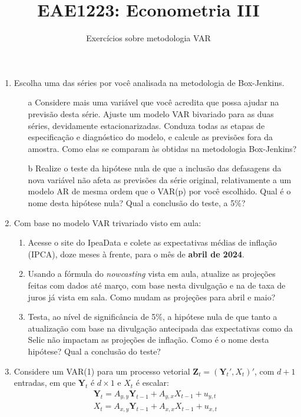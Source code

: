 \documentclass[10pt,a4paper]{article}
\title{\large EAE1223: Econometria III}
\author{\normalsize Exercícios sobre metodologia VAR}
\date{}
\begin{document}
	\maketitle
	\begin{enumerate}
\item Escolha uma das séries por você analisada na metodologia de Box-Jenkins.
\begin{enumerate}
	\item[a] Considere mais uma variável que você acredita que possa ajudar na previsão desta série. Ajuste um modelo VAR bivariado para as duas séries, devidamente estacionarizadas. Conduza todas as etapas de especificação e diagnóstico do modelo, e calcule as previsões fora da amostra. Como elas se comparam às obtidas na metodologia Box-Jenkins?
	\item[b] Realize o teste da hipótese nula de que a inclusão das defasagens da nova variável não afeta as previsões da série original, relativamente a um modelo AR de mesma ordem que o VAR(p) por você escolhido. Qual é o nome desta hipótese nula? Qual a conclusão do teste, a 5\%?
\end{enumerate}
\item Com base no modelo VAR trivariado visto em aula:
\begin{enumerate}
	\item Acesse o site do IpeaData e colete as expectativas médias de inflação (IPCA), doze meses à frente, para o mês de \textbf{abril de 2024}.
	\item Usando a fórmula do \textit{nowcasting} vista em aula, atualize as projeções feitas com dados até março, com base nesta divulgação e na de taxa de juros já vista em sala. Como mudam as projeções para abril e maio?
	\item Testa, ao nível de significância de 5\%, a hipótese nula de que tanto a atualização com base na divulgação antecipada das expectativas como da Selic não impactam as projeções de inflação. Como é o nome desta hipótese? Qual a conclusão do teste?
\end{enumerate}

\item Considere um VAR(1) para um processo vetorial $\boldsymbol{Z}_t = (\boldsymbol{Y}_t', X_t)'$, com $d+1$ entradas, em que $\boldsymbol{Y}_t$ é $d\times 1$ e $X_t$ é escalar:
\begin{align}
\boldsymbol{Y}_t = A_{y,y}\boldsymbol{Y}_{t-1} + A_{y,x}X_{t-1} + u_{y,t}  \label{full}
\\
X_t = A_{x,y}\boldsymbol{Y}_{t-1} + A_{x,x}X_{t-1} + u_{x,t}  \label{eq_marginal}
\end{align}


\end{enumerate}
\end{document}
